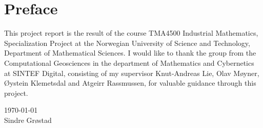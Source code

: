 {}
\chapter*{Preface}
This project report is the result of the course TMA4500 Industrial Mathematics, Specialization Project at the Norwegian University of Science and Technology, Department of Mathematical Sciences. I would like to thank the group from the Computational Geosciences in the department of Mathematics and Cybernetics at SINTEF Digital, consisting of my supervisor Knut-Andreas Lie, Olav Møyner, Øystein Klemetsdal and Atgeirr Rassmussen, for valuable guidance through this project.

\today \\
Sindre Grøstad